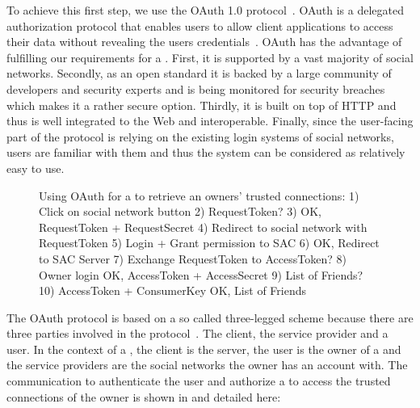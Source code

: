 To achieve this first step, we use the OAuth 1.0 protocol~\cite{Eran2010-oauth}. OAuth is a delegated authorization protocol that enables users to allow client applications to access their data without revealing the users credentials~\cite{Allamaraju2010}. OAuth has the advantage of fulfilling our requirements for a \sacLong{}. First, it is supported by a vast majority of social networks. Secondly, as an open standard it is backed by a large community of developers and security experts and is being monitored for security breaches which makes it a rather secure option. Thirdly, it is built on top of HTTP and thus is well integrated to the Web and interoperable. Finally, since the user-facing part of the protocol is relying on the existing login systems of social networks, users are familiar with them and thus the system can be considered as relatively easy to use.
\begin{figure}
\caption{Using OAuth for a \sac{} to retrieve an owners' trusted connections: 1) Click on social network button 2) RequestToken? 3) OK, RequestToken + RequestSecret 4) Redirect to social network with RequestToken 5) Login + Grant permission to SAC 6) OK, Redirect to SAC Server 7) Exchange RequestToken to AccessToken? 8) Owner login OK, AccessToken + AccessSecret 9) List of Friends? 10) AccessToken + ConsumerKey OK, List of Friends}
\label{fig:oauth}
\end{figure}

The OAuth protocol is based on a so called three-legged scheme because there are three parties involved in the protocol~\cite{Allamaraju2010}. The client, the service provider and a user. In the context of a \sac{}, the client is the \sac{} server, the user is the owner of a \st{} and the service providers are the social networks the owner has an account with. The communication to authenticate the user and authorize a \sac{} to access the trusted connections of the owner is shown in  and detailed here:

